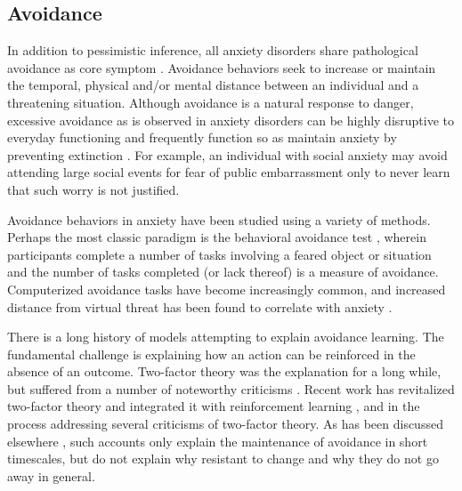 \documentclass[11pt]{article} %
\begin{document}
\subsection{Avoidance}

In addition to pessimistic inference, all anxiety disorders share pathological avoidance as core symptom \citep{dsm5, Krypotos2015, Arnaudova2017}. Avoidance behaviors seek to increase or maintain the temporal, physical and/or mental distance between an individual and a threatening situation. Although avoidance is a natural response to danger, excessive avoidance as is observed in anxiety disorders can be highly disruptive to everyday functioning \citep{Salter2004} and frequently function so as maintain anxiety by preventing extinction \citep{Arnaudova2017}. For example, an individual with social anxiety may avoid attending large social events for fear of public embarrassment only to never learn that such worry is not justified.

Avoidance behaviors in anxiety have been studied using a variety of methods. Perhaps the most classic paradigm is the behavioral avoidance test \citep{bandura1977}, wherein participants complete a number of tasks involving a feared object or situation and the number of tasks completed (or lack thereof) is a measure of avoidance. Computerized avoidance tasks have become increasingly common, and increased distance from virtual threat has been found to correlate with anxiety \citep{Bach2014, Bach2017, Sheynin2014}.

There is a long history of models attempting to explain avoidance learning. The fundamental challenge is explaining how an action can be reinforced in the absence of an outcome. Two-factor theory was the explanation for a long while, but suffered from a number of noteworthy criticisms \citep{Krypotos2015}. Recent work has revitalized two-factor theory and integrated it with reinforcement learning \citep{Moutoussis2008, Maia2010}, and in the process addressing several criticisms of two-factor theory. As has been discussed elsewhere \citep{Moutoussis2017}, such accounts only explain the maintenance of avoidance in short timescales, but do not explain why resistant to change and why they do not go away in general.
\end{document}
